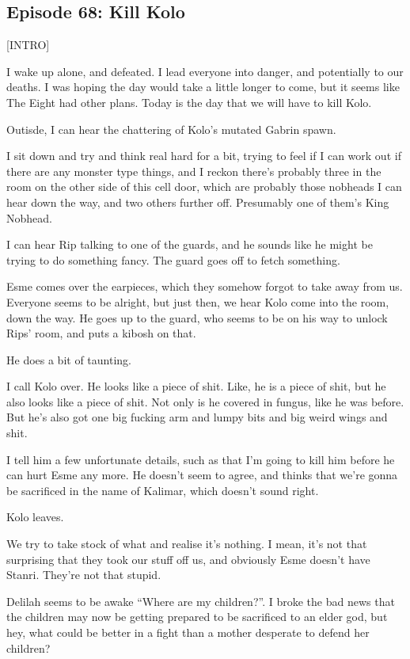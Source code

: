 \subsection{Episode 68: Kill Kolo}

[INTRO]\medskip

I wake up alone, and defeated. I lead everyone into danger, and potentially to our deaths. I was hoping the day would take a little longer to come, but it seems like The Eight had other plans. Today is the day that we will have to kill Kolo.\medskip

Outisde, I can hear the chattering of Kolo’s mutated Gabrin spawn.\medskip

I sit down and try and think real hard for a bit, trying to feel if I can work out if there are any monster type things, and I reckon there’s probably three in the room on the other side of this cell door, which are probably those nobheads I can hear down the way, and two others further off. Presumably one of them’s King Nobhead.\medskip

I can hear Rip talking to one of the guards, and he sounds like he might be trying to do something fancy. The guard goes off to fetch something.\medskip

Esme comes over the earpieces, which they somehow forgot to take away from us. Everyone seems to be alright, but just then, we hear Kolo come into the room, down the way. He goes up to the guard, who seems to be on his way to unlock Rips’ room, and puts a kibosh on that.\medskip

He does a bit of taunting.\medskip

I call Kolo over. He looks like a piece of shit. Like, he is a piece of shit, but he also looks like a piece of shit. Not only is he covered in fungus, like he was before. But he’s also got one big fucking arm and lumpy bits and big weird wings and shit.\medskip

I tell him a few unfortunate details, such as that I’m going to kill him before he can hurt Esme any more. He doesn’t seem to agree, and thinks that we’re gonna be sacrificed in the name of Kalimar, which doesn’t sound right.\medskip

Kolo leaves.\medskip

We try to take stock of what and realise it’s nothing. I mean, it’s not that surprising that they took our stuff off us, and obviously Esme doesn’t have Stanri. They’re not that stupid.\medskip

Delilah seems to be awake “Where are my children?”. I broke the bad news that the children may now be getting prepared to be sacrificed to an elder god, but hey, what could be better in a fight than a mother desperate to defend her children?\medskip

